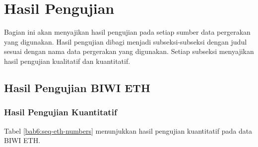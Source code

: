 \section{Hasil Pengujian}
\label{sec:result}

Bagian ini akan menyajikan hasil pengujian pada setiap sumber data pergerakan yang digunakan. Hasil pengujian dibagi menjadi subseksi-subseksi dengan judul sesuai dengan nama data pergerakan yang digunakan. Setiap subseksi menyajikan hasil pengujian kualitatif dan kuantitatif.

\subsection{Hasil Pengujian BIWI ETH}
\label{subsec:eth-result}

\subsubsection{Hasil Pengujian Kuantitatif}
\label{subsubsec:eth-quantitative}

Tabel \ref{bab6:seq-eth-numbers} menunjukkan hasil pengujian kuantitatif pada data BIWI ETH.

